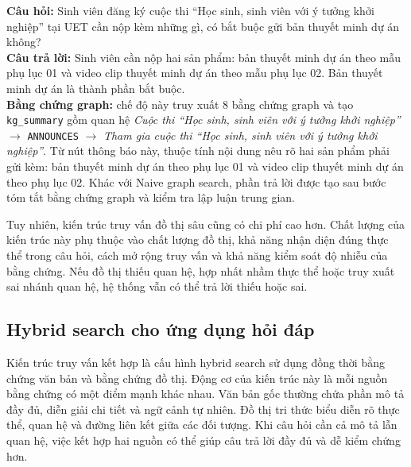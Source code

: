 \begin{tcolorbox}[
    enhanced,
    breakable,
    title={Ví dụ minh họa -- Deep graph search},
    fonttitle=\bfseries,
    colback=yellow!5,
    colframe=darkblue!70,
    boxrule=0.5pt,
    arc=1.5mm,
    left=6pt,
    right=6pt,
    top=5pt,
    bottom=5pt
]
\small
\textbf{Câu hỏi:} Sinh viên đăng ký cuộc thi ``Học sinh, sinh viên với ý tưởng khởi nghiệp'' tại UET cần nộp kèm những gì, có bắt buộc gửi bản thuyết minh dự án không?\\
\textbf{Câu trả lời:} Sinh viên cần nộp hai sản phẩm: bản thuyết minh dự án theo mẫu phụ lục 01 và video clip thuyết minh dự án theo mẫu phụ lục 02. Bản thuyết minh dự án là thành phần bắt buộc.\\
\textbf{Bằng chứng graph:} chế độ này truy xuất 8 bằng chứng graph và tạo \texttt{kg\_summary} gồm quan hệ \textit{Cuộc thi ``Học sinh, sinh viên với ý tưởng khởi nghiệp''} $\rightarrow$ \texttt{ANNOUNCES} $\rightarrow$ \textit{Tham gia cuộc thi ``Học sinh, sinh viên với ý tưởng khởi nghiệp''}. Từ nút thông báo này, thuộc tính nội dung nêu rõ hai sản phẩm phải gửi kèm: bản thuyết minh dự án theo phụ lục 01 và video clip thuyết minh dự án theo phụ lục 02. Khác với Naive graph search, phần trả lời được tạo sau bước tóm tắt bằng chứng graph và kiểm tra lập luận trung gian.\\
\end{tcolorbox}


Tuy nhiên, kiến trúc truy vấn đồ thị sâu cũng có chi phí cao hơn. Chất lượng của kiến trúc này phụ thuộc vào chất lượng đồ thị, khả năng nhận diện đúng thực thể trong câu hỏi, cách mở rộng truy vấn và khả năng kiểm soát độ nhiễu của bằng chứng. Nếu đồ thị thiếu quan hệ, hợp nhất nhầm thực thể hoặc truy xuất sai nhánh quan hệ, hệ thống vẫn có thể trả lời thiếu hoặc sai.

\subsection{Hybrid search cho ứng dụng hỏi đáp}

Kiến trúc truy vấn kết hợp là cấu hình hybrid search sử dụng đồng thời bằng chứng văn bản và bằng chứng đồ thị. Động cơ của kiến trúc này là mỗi nguồn bằng chứng có một điểm mạnh khác nhau. Văn bản gốc thường chứa phần mô tả đầy đủ, diễn giải chi tiết và ngữ cảnh tự nhiên. Đồ thị tri thức biểu diễn rõ thực thể, quan hệ và đường liên kết giữa các đối tượng. Khi câu hỏi cần cả mô tả lẫn quan hệ, việc kết hợp hai nguồn có thể giúp câu trả lời đầy đủ và dễ kiểm chứng hơn.

